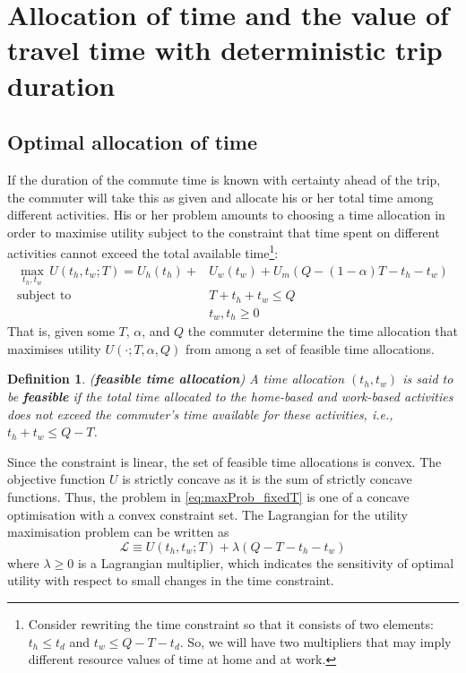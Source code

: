 \documentclass[12pt,a4paper,british]{article}
\newtheorem{definition}{Definition}[section]
\begin{document}
\section{Allocation of time and the value of travel time with deterministic trip duration}

\subsection{Optimal allocation of time}

If the duration of the commute time is known with certainty ahead of the trip, the commuter will take this as given and allocate his or her total time among different activities. His or her problem amounts to choosing a time allocation in order to maximise utility subject to the constraint that time spent on different activities cannot exceed the total available time\footnote{Consider rewriting the time constraint so that it consists of two elements: $t_h \leq t_d$ and $t_w \leq Q-T-t_d$. So, we will have two multipliers that may imply different resource values of time at home and at work.}:
\begin{equation}
\begin{aligned}
    \max_{t_{h},t_{w}} \, U\left(t_{h},t_{w};T\right) = U_{h} \left(t_{h}\right) + & U_{w}\left(t_{w}\right) + U_{m}\left( Q - \left(1-\alpha\right) T - t_{h} - t_{w} \right) \\
    \mbox{subject to} \quad & T + t_{h} + t_{w} \leq Q \\
                      \quad & t_w, t_h \geq 0 
\end{aligned}
\label{eq:maxProb_fixedT}
\end{equation}
That is, given some $T$, $\alpha$, and $Q$ the commuter determine the time allocation that maximises utility $U\left( \cdot; T, \alpha, Q \right)$ from among a set of feasible time allocations. 

\begin{definition}
(\textbf{feasible time allocation}) A time allocation $\left( t_h, t_w \right)$ is said to be \textbf{\textit{feasible}} if the total time allocated to the home-based and work-based activities does not exceed the commuter's time available for these activities, i.e., $t_h + t_w \leq Q - T$. 
\end{definition}

Since the constraint is linear, the set of feasible time allocations is convex. The objective function $U$ is strictly concave as it is the sum of strictly concave functions. Thus, the problem in \eqref{eq:maxProb_fixedT} is one of a concave optimisation with a convex constraint set. The Lagrangian for the utility maximisation problem can be written as
\begin{equation*}
\mathcal{L} \equiv U\left(t_{h},t_{w};T\right) + \lambda \left(Q - T - t_{h} - t_{w}\right)
\end{equation*}%
where $\lambda\geq0$ is a Lagrangian multiplier, which indicates the sensitivity of optimal utility with respect to small changes in the time constraint. 
\end{document}
